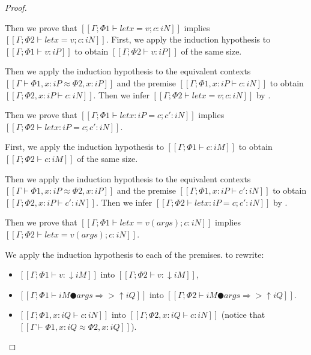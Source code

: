 \begin{proof}
\begin{caseof}
        \item {}
            Then we prove that 
            $[[Γ ; Φ1 ⊢ let x = v; c : iN]]$ implies $[[Γ ; Φ2 ⊢ let x = v; c : iN]]$.
            First, we apply the induction hypothesis to 
            $[[Γ; Φ1 ⊢ v : iP]]$ to obtain $[[Γ; Φ2 ⊢ v : iP]]$ 
            of the same size.
            
            Then we apply the induction hypothesis to
            the equivalent contexts $[[Γ ⊢ Φ1, x:iP ≈ Φ2, x:iP]]$
            and the premise $[[Γ ; Φ1, x:iP ⊢ c : iN]]$ to obtain
            $[[Γ ; Φ2, x:iP ⊢ c : iN]]$.
            Then we infer $[[Γ ; Φ2 ⊢ let x = v; c : iN]]$ by .

        \item {}
            Then we prove that 
            $[[Γ ; Φ1 ⊢ let x : iP = c; c' : iN]]$ implies $[[Γ ; Φ2 ⊢ let x : iP = c; c' : iN]]$.

            First, we apply the induction hypothesis to 
            $[[Γ; Φ1 ⊢ c : iM]]$ to obtain $[[Γ; Φ2 ⊢ c : iM]]$
            of the same size.
            
            Then we apply the induction hypothesis to
            the equivalent contexts $[[Γ ⊢ Φ1, x:iP ≈ Φ2, x:iP]]$
            and the premise $[[Γ ; Φ1, x:iP ⊢ c' : iN]]$ to obtain
            $[[Γ ; Φ2, x:iP ⊢ c' : iN]]$.
            Then we infer $[[Γ ; Φ2 ⊢ let x : iP = c; c' : iN]]$ by .

        \item {}
            Then we prove that 
            $[[Γ ; Φ1 ⊢ let x = v(args); c : iN]]$ implies 
            $[[Γ ; Φ2 ⊢ let x = v(args); c : iN]]$.

            We apply the induction hypothesis to each of the premises.
            to rewrite:
            \begin{itemize}
                \item $[[Γ ; Φ1 ⊢ v : ↓iM]]$ into $[[Γ ; Φ2 ⊢ v : ↓iM]]$,
                \item $[[Γ ; Φ1 ⊢ iM ● args ⇒> ↑iQ]]$ into $[[Γ ; Φ2 ⊢ iM ● args ⇒> ↑iQ]]$.
                \item $[[Γ ; Φ1, x:iQ ⊢ c : iN]]$ into $[[Γ ; Φ2, x:iQ ⊢ c : iN]]$
                (notice that $[[Γ ⊢ Φ1, x:iQ ≈ Φ2, x:iQ]]$).
            \end{itemize}


\end{caseof}
\end{proof}
